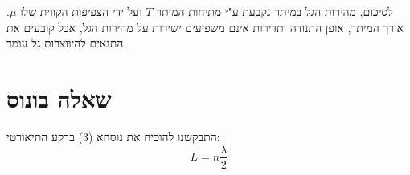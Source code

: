 \documentclass[14pt]{extarticle}
\begin{document}
לסיכום, מהירות הגל במיתר נקבעת ע"י מתיחות המיתר $T$ ועל ידי הצפיפות הקווית שלו $\mu$. אורך המיתר, אופן התנודה ותדירות אינם משפיעים ישירות על מהירות הגל, אבל קובעים את התנאים להיווצרות גל עומד.

\section*{שאלה בונוס}
התבקשנו להוכיח את נוסחא (3) ברקע התיאורטי:
\begin{equation*}
L=n\frac{\lambda}{2}
\end{equation*}
\end{document}
